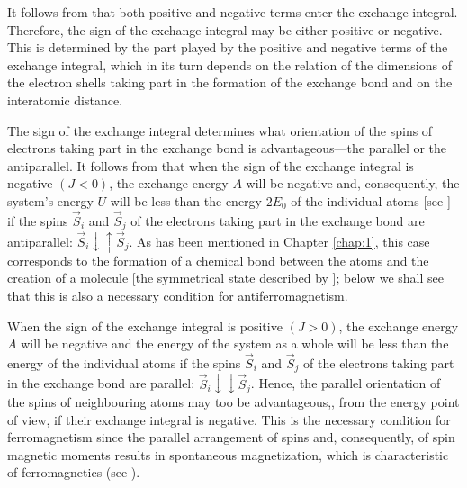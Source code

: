 It follows from  that both positive and negative terms enter the exchange integral. Therefore, the sign of the exchange integral may be either positive or negative. This is determined by the part played by the positive and negative terms of the exchange integral, which in its turn depends on the relation of the dimensions of the electron shells taking part in the formation of the exchange bond and on the interatomic distance.

The sign of the exchange integral determines what orientation of the spins of electrons taking part in the exchange bond is advantageous---the parallel or the antiparallel. It follows from  that
when the sign of the exchange integral is negative $(J<0)$, the exchange energy $A$ will be negative and, consequently, the system's energy $U$ will be less than the energy $2E_0$ of the individual atoms [see ] if the spins $\vec{S}_i$ and $\vec{S}_j$ of the electrons taking part in the exchange bond are antiparallel: $\vec{S}_i\downarrow\uparrow\vec{S}_j$. As has been mentioned in Chapter \ref{chap:1}, this case corresponds to the formation of a chemical bond between the atoms and the creation of a molecule [the symmetrical state described by ]; below we shall see that this is also a necessary condition for antiferromagnetism.

When the sign of the exchange integral is positive $(J>0)$, the exchange energy $A$ will be negative and the energy of the system as a whole will be less than the energy of the individual atoms if the spins $\vec{S}_i$ and $\vec{S}_j$ of the electrons taking part in the exchange bond are parallel: $\vec{S}_i\downarrow\downarrow\vec{S}_j$. Hence, the parallel orientation of the spins of neighbouring atoms may too be advantageous,, from the energy point of view, if their exchange integral is negative. This is the necessary condition for ferromagnetism since the parallel arrangement of spins and, consequently, of spin magnetic moments results in spontaneous magnetization, which is characteristic of ferromagnetics (see ).

